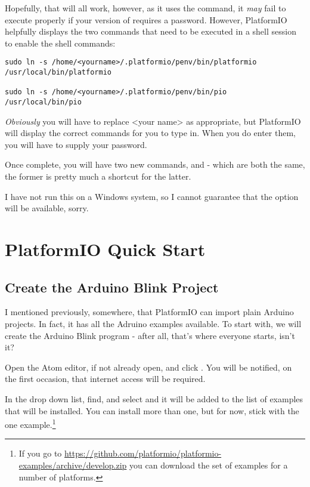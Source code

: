 Hopefully, that will all work, however, as it uses the  command, it \emph{may} fail to execute properly if your version of  requires a password. However, PlatformIO helpfully displays the two commands that need to be executed in a shell session to enable the shell commands:

\begin{lstlisting}[caption={Install PlatformIO Shell Commands Manually}]
sudo ln -s /home/<yourname>/.platformio/penv/bin/platformio /usr/local/bin/platformio

sudo ln -s /home/<yourname>/.platformio/penv/bin/pio /usr/local/bin/pio
\end{lstlisting}

\emph{Obviously} you will have to replace <your name> as appropriate, but PlatformIO will display the correct commands for you to type in. When you do enter them, you will have to supply your  password.

Once complete, you will have two new commands,  and  - which are both the same, the former is pretty much a shortcut for the latter.

\begin{note}
	I have not run this on a Windows system, so I cannot guarantee that the option will be available, sorry.
\end{note}

\section{PlatformIO Quick Start}\label{platformio-quick-start}

\subsection{Create the Arduino Blink Project}\label{create-the-arduino-blink-project}

I mentioned previously, somewhere, that PlatformIO can import plain Arduino projects. In fact, it has all the Adruino examples available. To start with, we will create the Arduino Blink program - after all, that's where everyone starts, isn't it?

Open the Atom editor, if not already open, and click . You will be notified, on the first occasion, that internet access will be required.

In the drop down list, find, and select  and it will be added to the list of examples that will be installed. You can install more than one, but for now, stick with the one example.\footnote{If you go to \url{https://github.com/platformio/platformio-examples/archive/develop.zip} you can download the set of examples for a number of platforms.}

